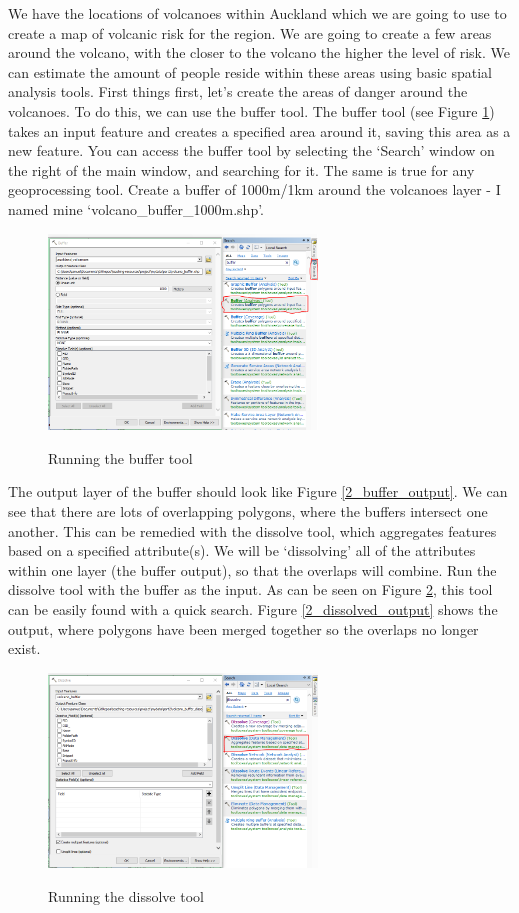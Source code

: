 \documentclass{article}
\begin{document}
We have the locations of volcanoes within Auckland which we are going to use to create a map of volcanic risk for the region. We are going to create a few areas around the volcano, with the closer to the volcano the higher the level of risk. We can estimate the amount of people reside within these areas using basic spatial analysis tools. First things first, let's create the areas of danger around the volcanoes. To do this, we can use the buffer tool. The buffer tool (see Figure \ref{2_volcanobuffer}) takes an input feature and creates a specified area around it, saving this area as a new feature. You can access the buffer tool by selecting the `Search' window on the right of the main window, and searching for it. The same is true for any geoprocessing tool. Create a buffer of 1000m/1km around the volcanoes layer - I named mine `volcano\_buffer\_1000m.shp'.

\begin{figure}[h]
  \centering
  \caption{Running the buffer tool}
  \includegraphics[width=270px]{images/part2/volcano_buffer.PNG}
  \label{2_volcanobuffer}
\end{figure}

The output layer of the buffer should look like Figure \ref{2_buffer_output}. We can see that there are lots of overlapping polygons, where the buffers intersect one another. This can be remedied with the dissolve tool, which aggregates features based on a specified attribute(s). We will be `dissolving' all of the attributes within one layer (the buffer output), so that the overlaps will combine. Run the dissolve tool with the buffer as the input. As can be seen on Figure \ref{2_dissolve}, this tool can be easily found with a quick search. Figure \ref{2_dissolved_output} shows the output, where polygons have been merged together so the overlaps no longer exist.

\begin{figure}[h]
  \centering
  \caption{Running the dissolve tool}
  \includegraphics[width=270px]{images/part2/volcano_buffer_dissolved.PNG}
  \label{2_dissolve}
\end{figure}
\end{document}
